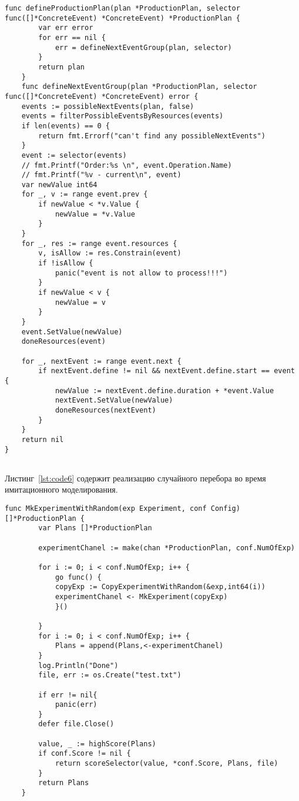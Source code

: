 \begin{lstlisting}[language=Golang,caption={Планирование},label=lst:code5]
    func defineProductionPlan(plan *ProductionPlan, selector func([]*ConcreteEvent) *ConcreteEvent) *ProductionPlan {
        var err error
        for err == nil {
            err = defineNextEventGroup(plan, selector)
        }
        return plan
    }
    func defineNextEventGroup(plan *ProductionPlan, selector func([]*ConcreteEvent) *ConcreteEvent) error {
	events := possibleNextEvents(plan, false)
    events = filterPossibleEventsByResources(events)
    if len(events) == 0 {
		return fmt.Errorf("сan't find any possibleNextEvents")
	}
    event := selector(events)
	// fmt.Printf("Order:%s \n", event.Operation.Name)
	// fmt.Printf("%v - current\n", event)
	var newValue int64
	for _, v := range event.prev {
		if newValue < *v.Value {
			newValue = *v.Value
		}
	}
	for _, res := range event.resources {
		v, isAllow := res.Constrain(event)
		if !isAllow {
			panic("event is not allow to process!!!")
		}
		if newValue < v {
			newValue = v
		}
	}
	event.SetValue(newValue)
	doneResources(event)

	for _, nextEvent := range event.next {
		if nextEvent.define != nil && nextEvent.define.start == event {
			newValue := nextEvent.define.duration + *event.Value
			nextEvent.SetValue(newValue)
			doneResources(nextEvent)
		} 
	}
	return nil
}


\end{lstlisting}

Листинг~\ref{lst:code6} содержит реализацию случайного перебора во время имитационного моделирования.
\begin{lstlisting}[language=Golang,caption={Случайный перебор},label=lst:code6]
    func MkExperimentWithRandom(exp Experiment, conf Config) []*ProductionPlan {
        var Plans []*ProductionPlan
    
        experimentChanel := make(chan *ProductionPlan, conf.NumOfExp)
    
        for i := 0; i < conf.NumOfExp; i++ {
            go func() {
            copyExp := CopyExperimentWithRandom(&exp,int64(i))
            experimentChanel <- MkExperiment(copyExp)
            }()
        
        }
        for i := 0; i < conf.NumOfExp; i++ {
            Plans = append(Plans,<-experimentChanel)
        }
        log.Println("Done")
        file, err := os.Create("test.txt")
    
        if err != nil{
            panic(err)
        }
        defer file.Close()
    
        value, _ := highScore(Plans)
        if conf.Score != nil {
            return scoreSelector(value, *conf.Score, Plans, file)
        }
        return Plans
    }
\end{lstlisting}



